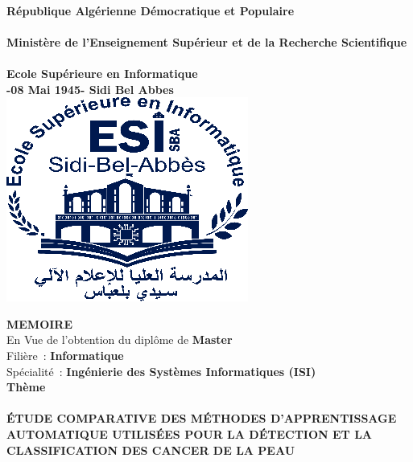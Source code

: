 \begin{titlepage}
    \begin{center}	
         \\
        \textbf{République Algérienne Démocratique et Populaire} \\
         \\
        \textbf{Ministère de l’Enseignement Supérieur et de la Recherche Scientifique} \\
         \\
        \textbf{Ecole Supérieure en Informatique} \\
        \textbf{-08 Mai 1945- Sidi Bel Abbes} \\

        \bigskip
        \includegraphics[]{./cover-page/logo.png}
        \bigskip
        
        \textbf{MEMOIRE} \\
        \vspace{0.2cm}
        En Vue de l’obtention du diplôme de \textbf{Master} \\
        \vspace{0.2cm}
        Filière : \textbf{Informatique}\\
        \vspace{0.2cm}
        Spécialité : \textbf{Ingénierie des Systèmes Informatiques (ISI)}\\
        \LARGE
        \textbf{Thème} \\
        \hrulefill \\
        \normalsize
        \textbf{ÉTUDE COMPARATIVE DES MÉTHODES D'APPRENTISSAGE AUTOMATIQUE  UTILISÉES POUR LA DÉTECTION ET LA CLASSIFICATION DES CANCER DE LA PEAU} \\
        \hrulefill \\



\end{center}
\end{titlepage}
